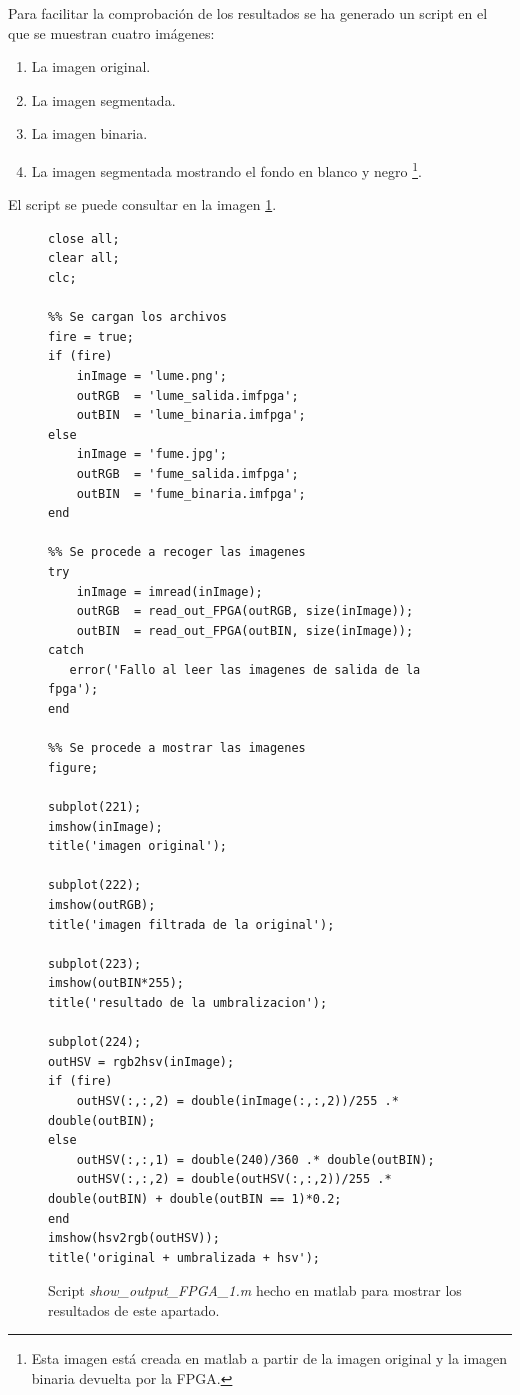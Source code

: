 \documentclass{article}
\begin{document}
	Para facilitar la comprobación de los resultados se ha generado un script en el que se muestran cuatro imágenes:
\begin{enumerate}
	\item La imagen original.
	\item La imagen segmentada.
	\item La imagen binaria.
	\item La imagen segmentada mostrando el fondo en blanco y negro
\footnote{Esta imagen está creada en matlab a partir de la imagen original y la imagen binaria devuelta por la FPGA.}.
\end{enumerate}
	El script se puede consultar en la imagen \ref{cod:p7a:show_output_FPGA}.

\begin{figure}[h]
	\begin{lstlisting}[style=matlab]	
close all;
clear all;
clc;

%% Se cargan los archivos
fire = true;
if (fire)
    inImage = 'lume.png';
    outRGB  = 'lume_salida.imfpga';
    outBIN  = 'lume_binaria.imfpga';
else
    inImage = 'fume.jpg';
    outRGB  = 'fume_salida.imfpga';
    outBIN  = 'fume_binaria.imfpga';
end

%% Se procede a recoger las imagenes
try
    inImage = imread(inImage);
    outRGB  = read_out_FPGA(outRGB, size(inImage));
    outBIN  = read_out_FPGA(outBIN, size(inImage));
catch
   error('Fallo al leer las imagenes de salida de la fpga'); 
end

%% Se procede a mostrar las imagenes
figure;

subplot(221);
imshow(inImage);
title('imagen original');

subplot(222);
imshow(outRGB);
title('imagen filtrada de la original');

subplot(223);
imshow(outBIN*255);
title('resultado de la umbralizacion');

subplot(224);
outHSV = rgb2hsv(inImage);
if (fire)
    outHSV(:,:,2) = double(inImage(:,:,2))/255 .* double(outBIN);
else
    outHSV(:,:,1) = double(240)/360 .* double(outBIN);
    outHSV(:,:,2) = double(outHSV(:,:,2))/255 .* double(outBIN) + double(outBIN == 1)*0.2;
end
imshow(hsv2rgb(outHSV));
title('original + umbralizada + hsv');
	\end{lstlisting}
	\caption{Script \emph{show\_output\_FPGA\_1.m} hecho en matlab para mostrar los resultados de este apartado.}
	\label{cod:p7a:show_output_FPGA}
\end{figure}	
\end{document}
